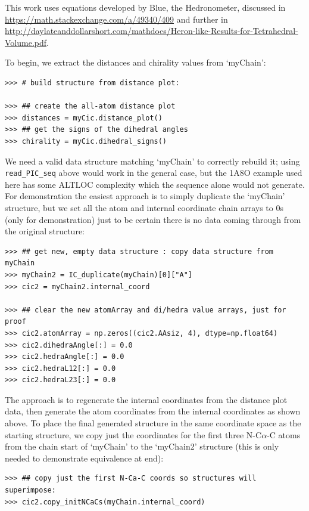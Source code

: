 This work uses equations developed by Blue, the Hedronometer,
discussed in \url{https://math.stackexchange.com/a/49340/409} and further in 
\url{http://daylateanddollarshort.com/mathdocs/Heron-like-Results-for-Tetrahedral-Volume.pdf}.

To begin, we extract the distances and chirality values from `myChain':

\begin{verbatim}
>>> # build structure from distance plot:

>>> ## create the all-atom distance plot
>>> distances = myCic.distance_plot()
>>> ## get the signs of the dihedral angles
>>> chirality = myCic.dihedral_signs()
\end{verbatim}

We need a valid data structure matching `myChain' to correctly rebuild it; using
\texttt{read\_PIC\_seq\(\)} above would work in the general case, but the 1A8O example
used here has some ALTLOC complexity which the sequence alone would not generate.
For demonstration the easiest approach is to simply duplicate the `myChain'
structure, but we set all the atom and internal coordinate chain arrays to 0s
(only for demonstration) just to be certain there is no data coming through from the
original structure:

\begin{verbatim}
>>> ## get new, empty data structure : copy data structure from myChain
>>> myChain2 = IC_duplicate(myChain)[0]["A"]
>>> cic2 = myChain2.internal_coord

>>> ## clear the new atomArray and di/hedra value arrays, just for proof
>>> cic2.atomArray = np.zeros((cic2.AAsiz, 4), dtype=np.float64)
>>> cic2.dihedraAngle[:] = 0.0
>>> cic2.hedraAngle[:] = 0.0
>>> cic2.hedraL12[:] = 0.0
>>> cic2.hedraL23[:] = 0.0
\end{verbatim}

The approach is to regenerate the internal coordinates from the distance plot
data, then generate the atom coordinates from the internal coordinates as shown
above.  To place the final generated structure in the same coordinate space as the
starting structure, we copy just the coordinates for the first three N-C$\alpha$-C
atoms from the chain start of `myChain' to the `myChain2' structure (this is only needed
to demonstrate equivalence at end):

\begin{verbatim}
>>> ## copy just the first N-Ca-C coords so structures will superimpose:
>>> cic2.copy_initNCaCs(myChain.internal_coord)
\end{verbatim}


